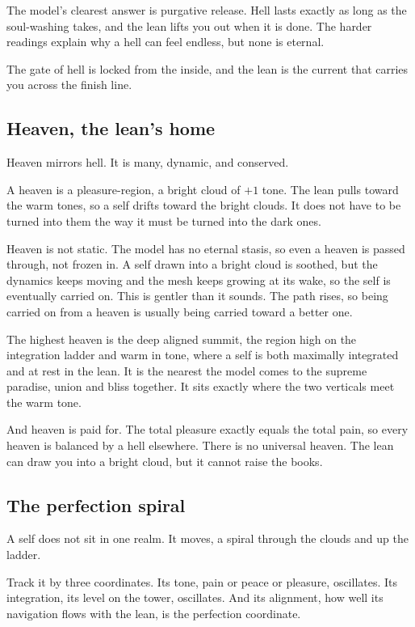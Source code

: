 The model's clearest answer is purgative release. Hell lasts exactly as long as the soul-washing takes, and the lean lifts you out when it is done. The harder readings explain why a hell can feel endless, but none is eternal.

\begin{principle}
The gate of hell is locked from the inside, and the lean is the current that carries you across the finish line.
\end{principle}

\subsection{Heaven, the lean's home}

Heaven mirrors hell. It is many, dynamic, and conserved.

A heaven is a pleasure-region, a bright cloud of $+1$ tone. The lean pulls toward the warm tones, so a self drifts toward the bright clouds. It does not have to be turned into them the way it must be turned into the dark ones.

Heaven is not static. The model has no eternal stasis, so even a heaven is passed through, not frozen in. A self drawn into a bright cloud is soothed, but the dynamics keeps moving and the mesh keeps growing at its wake, so the self is eventually carried on. This is gentler than it sounds. The path rises, so being carried on from a heaven is usually being carried toward a better one.

The highest heaven is the deep aligned summit, the region high on the integration ladder and warm in tone, where a self is both maximally integrated and at rest in the lean. It is the nearest the model comes to the supreme paradise, union and bliss together. It sits exactly where the two verticals meet the warm tone.

And heaven is paid for. The total pleasure exactly equals the total pain, so every heaven is balanced by a hell elsewhere. There is no universal heaven. The lean can draw you into a bright cloud, but it cannot raise the books.

\subsection{The perfection spiral}

A self does not sit in one realm. It moves, a spiral through the clouds and up the ladder.

Track it by three coordinates. Its tone, pain or peace or pleasure, oscillates. Its integration, its level on the tower, oscillates. And its alignment, how well its navigation flows with the lean, is the perfection coordinate.

